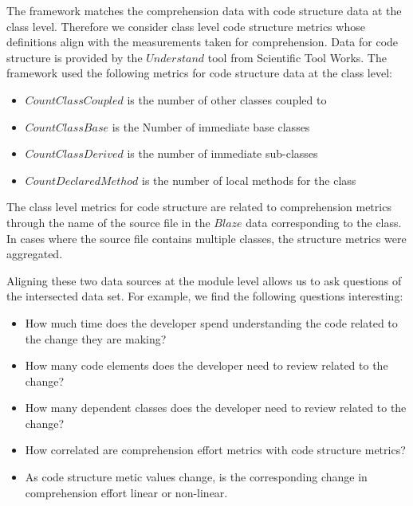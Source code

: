   

The framework matches the comprehension data with code structure data at the class level.  Therefore we consider class level code structure metrics whose definitions align with the measurements taken for comprehension.  Data for code structure is provided by the $Understand$ tool from Scientific Tool Works.  The framework used the following metrics for code structure data at the class level:

\begin{itemize}
	\item[] $Count Class Coupled$ is the number of other classes coupled to
	\item[] $Count Class Base$ is the Number of immediate base classes
	\item[] $Count Class Derived$ is the number of immediate sub-classes
	\item[] $Count Declared Method$ is the number of local methods for the class
\end{itemize}

The class level metrics for code structure are related to comprehension metrics through the name of the source file in the $Blaze$ data corresponding to the class.  In cases where the source file contains multiple classes, the structure metrics were aggregated.

Aligning these two data sources at the module level allows us to ask questions of the intersected data set.  For example, we find the following questions interesting:

\begin{itemize}
	\item[] How much time does the developer spend understanding the code related to the change they are making?
	\item[] How many code elements does the developer need to review related to the change?
	\item[] How many dependent classes does the developer need to review related to the change?
	\item[] How correlated are comprehension effort metrics with code structure metrics?
	\item[] As code structure metic values change, is the corresponding change in comprehension effort linear or non-linear.
\end{itemize}
